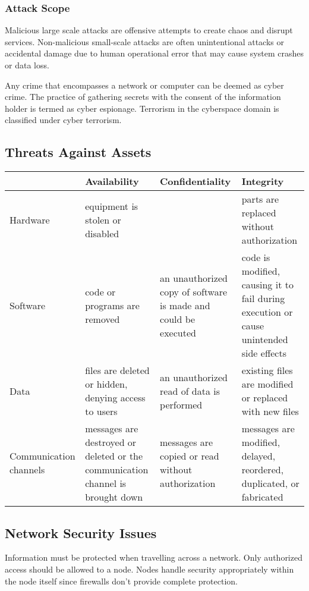 \documentclass{math}
\begin{document}
\subsubsection*{Attack Scope}
Malicious large scale attacks are offensive attempts to create chaos and disrupt
services. Non-malicious small-scale attacks are often unintentional attacks or
accidental damage due to human operational error that may cause system crashes
or data loss. \par
Any crime that encompasses a network or computer can be deemed as cyber crime.
The practice of gathering secrets with the consent of the information holder is
termed as cyber espionage. Terrorism in the cyberspace domain is classified
under cyber terrorism.

\subsection*{Threats Against Assets}
\begin{center}
  \begin{tabular}{|p{3cm}|p{4cm}|p{4cm}|p{4cm}|}
    \hline
    & Availability & Confidentiality & Integrity \\
    \hline
    Hardware & equipment is stolen or disabled & & parts are replaced without
      authorization \\
    \hline
    Software & code or programs are removed & an unauthorized copy of software
      is made and could be executed & code is modified, causing it to fail
      during execution or cause unintended side effects \\
    \hline
    Data & files are deleted or hidden, denying access to users & an
      unauthorized read of data is performed & existing files are modified or
      replaced with new files \\
    \hline
    Communication channels & messages are destroyed or deleted or the
      communication channel is brought down & messages are copied or read
      without authorization & messages are modified, delayed, reordered,
      duplicated, or fabricated \\
    \hline
  \end{tabular}
\end{center}

\subsection*{Network Security Issues}
Information must be protected when travelling across a network. Only
authorized access should be allowed to a node. Nodes handle security
appropriately within the node itself since firewalls don't provide complete
protection.
\end{document}
